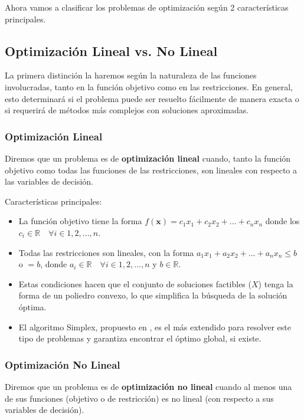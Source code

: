 \documentclass[12pt,a4paper]{book}
\begin{document}
Ahora vamos a clasificar los problemas de optimización según 2 características principales.

\subsection{Optimización Lineal vs. No Lineal}

La primera distinción la haremos según la naturaleza de las funciones involucradas, tanto en la función objetivo como en las restricciones. En general, esto determinará si el problema puede ser resuelto fácilmente de manera exacta o si requerirá de métodos más complejos con soluciones aproximadas.

\subsubsection{Optimización Lineal}
Diremos que un problema es de \textbf{optimización lineal} cuando, tanto la función objetivo como todas las funciones de las restricciones, son lineales con respecto a las variables de decisión. 

Características principales:
\begin{itemize}
    \item La función objetivo tiene la forma $f(\mathbf{x})=c_1x_1+c_2x_2+...+c_nx_n$ donde los $c_i \in \mathbb{R} \quad \forall i \in 1,2,...,n$.
    \item Todas las restricciones son lineales, con la forma $a_1x_1+a_2x_2+...+a_nx_n\leq b$ o $=b$, donde $a_i \in \mathbb{R} \quad \forall i \in 1,2,...,n$ y $b\in \mathbb{R}$.
    \item Estas condiciones hacen que el conjunto de soluciones factibles ($X$) tenga la forma de un poliedro convexo, lo que simplifica la búsqueda de la solución óptima.
    \item El algoritmo Simplex, propuesto en \cite{Dantzig1951}, es el más extendido para resolver este tipo de problemas y garantiza encontrar el óptimo global, si existe.
\end{itemize}

\subsubsection{Optimización No Lineal}
Diremos que un problema es de \textbf{optimización no lineal} cuando al menos una de sus funciones (objetivo o de restricción) es no lineal (con respecto a sus variables de decisión). 
\end{document}
